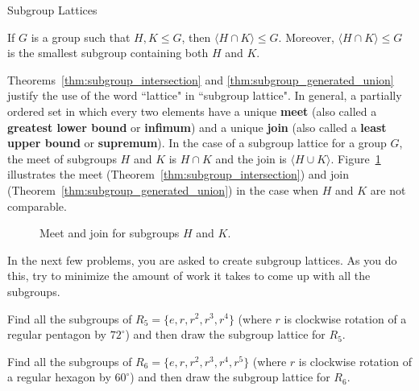 \begin{section}{Subgroup Lattices}
\begin{theorem}\label{thm:subgroup_generated_union}
If $G$ is a group such that $H,K\leq G$, then $\langle H\cap K\rangle\leq G$. Moreover, $\langle H\cap K\rangle\leq G$ is the smallest subgroup containing both $H$ and $K$.
\end{theorem}

Theorems~\ref{thm:subgroup_intersection} and \ref{thm:subgroup_generated_union} justify the use of the word ``lattice" in ``subgroup lattice".  In general, a partially ordered set in which every two elements have a unique \textbf{meet} (also called a \textbf{greatest lower bound} or \textbf{infimum}) and a unique \textbf{join} (also called a \textbf{least upper bound} or \textbf{supremum}).  In the case of a subgroup lattice for a group $G$, the meet of subgroups $H$ and $K$ is $H\cap K$ and the join is $\langle H\cup K\rangle$.  Figure~\ref{fig:diamond} illustrates the meet (Theorem~\ref{thm:subgroup_intersection}) and join (Theorem~\ref{thm:subgroup_generated_union}) in the case when $H$ and $K$ are not comparable.

\begin{figure}[!ht]
\centering
{}
\caption{Meet and join for subgroups $H$ and $K$.}
\label{fig:diamond}
\end{figure}

In the next few problems, you are asked to create subgroup lattices.  As you do this, try to minimize the amount of work it takes to come up with all the subgroups.

\begin{problem}
Find all the subgroups of $R_5=\{e,r,r^2,r^3,r^4\}$ (where $r$ is clockwise rotation of a regular pentagon by $72^{\circ}$) and then draw the subgroup lattice for $R_5$.
\end{problem}

\begin{problem}
Find all the subgroups of $R_6=\{e,r,r^2,r^3,r^4,r^5\}$ (where $r$ is clockwise rotation of a regular hexagon by $60^{\circ}$) and then draw the subgroup lattice for $R_6$.
\end{problem}


\end{section}
